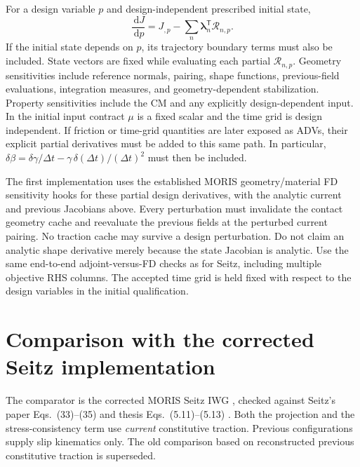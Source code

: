 \documentclass[11pt,a4paper]{article}
\newcommand{\dd}{\,\mathrm{d}}
\newcommand{\tr}{^{\mathsf T}}
\begin{document}
For a design variable $p$ and design-independent prescribed initial state,
\begin{equation}
 \frac{\dd J}{\dd p}=J_{,p}
 -\sum_n\bm\lambda_n\tr\mathcal R_{n,p}.
\end{equation}
If the initial state depends on $p$, its trajectory boundary terms must also be
included. State vectors are fixed while evaluating each partial
$\mathcal R_{n,p}$. Geometry sensitivities include reference normals, pairing,
shape functions, previous-field evaluations, integration measures, and
geometry-dependent stabilization. Property sensitivities include the CM and any explicitly design-dependent
input. In the initial input contract $\mu$ is a fixed scalar and the time grid
is design independent. If friction or time-grid quantities are later exposed as
ADVs, their explicit partial derivatives must be added to this same path. In
particular, $\delta\beta=\delta\gamma/\Delta t-
\gamma\,\delta(\Delta t)/(\Delta t)^2$ must then be included.

The first implementation uses the established MORIS geometry/material FD
sensitivity hooks for these partial design derivatives, with the analytic
current and previous Jacobians above. Every perturbation must invalidate the
contact geometry cache and reevaluate the previous fields at the perturbed
current pairing. No traction cache may survive a design perturbation.
Do not claim an analytic shape derivative merely because the state Jacobian is
analytic. Use the same end-to-end adjoint-versus-FD checks as for Seitz, including
multiple objective RHS columns. The accepted time grid is held fixed with
respect to the design variables in the initial qualification.

\section{Comparison with the corrected Seitz implementation}
The comparator is the corrected MORIS Seitz IWG \cite{moriscode}, checked against
Seitz's paper Eqs.~(33)--(35) and thesis Eqs.~(5.11)--(5.13)
\cite{seitz2019,seitz2019thesis}. Both the projection and the stress-consistency
term use \emph{current} constitutive traction. Previous configurations supply
slip kinematics only. The old comparison based on reconstructed previous
constitutive traction is superseded.
\end{document}
